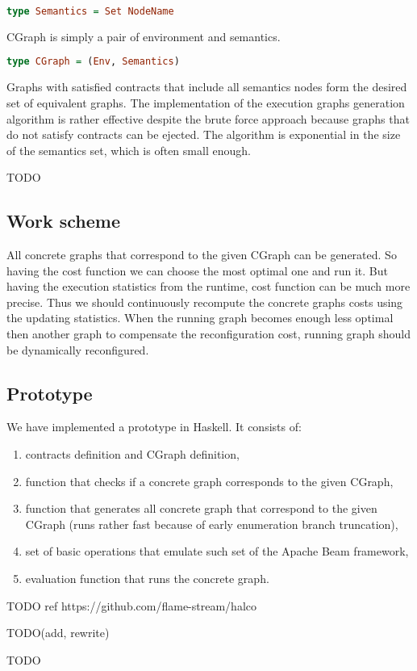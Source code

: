 \begin{lstlisting}[language=Haskell]
type Semantics = Set NodeName
\end{lstlisting}

CGraph is simply a pair of environment and semantics.

\begin{lstlisting}[language=Haskell]
type CGraph = (Env, Semantics)
\end{lstlisting}

Graphs with satisfied contracts that include all semantics nodes form the desired set of equivalent graphs. The implementation of the execution graphs generation algorithm is rather effective despite the brute force approach because graphs that do not satisfy contracts can be ejected. The algorithm is exponential in the size of the semantics set, which is often small enough.

TODO

\subsection{Work scheme}

All concrete graphs that correspond to the given CGraph can be generated.
So having the cost function we can choose the most optimal one and run it.
But having the execution statistics from the runtime, cost function can be much more precise.
Thus we should continuously recompute the concrete graphs costs using the updating statistics.
When the running graph becomes enough less optimal then another graph to compensate the reconfiguration cost, running graph should be dynamically reconfigured.

\subsection{Prototype}

We have implemented a prototype in Haskell.
It consists of:
\begin{enumerate}
    \item contracts definition and CGraph definition,
    \item function that checks if a concrete graph corresponds to the given CGraph,
    \item function that generates all concrete graph that correspond to the given CGraph (runs rather fast because of early enumeration branch truncation),
    \item set of basic operations that emulate such set of the Apache Beam framework,
    \item evaluation function that runs the concrete graph.
\end{enumerate}

TODO ref https://github.com/flame-stream/halco

TODO(add, rewrite)

TODO
